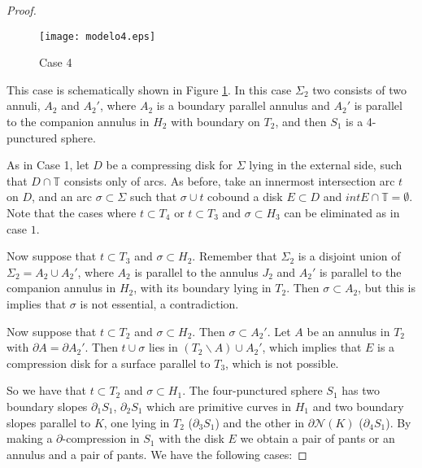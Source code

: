 \documentclass[12pt]{amsart}
\begin{document}
\begin{proof}
\begin{figure}
\begin{center}
\texttt{[image: modelo4.eps]}
\end{center}
\caption{Case 4}
\label{case4}
\end{figure}



This case is schematically shown in Figure \ref{case4}. In this case $\Sigma_2$ two consists of two annuli, $A_2$ and $A_2'$, where $A_2$ is a boundary parallel annulus and $A_2'$ is parallel to the companion annulus in $H_2$ with boundary on $T_2$, and then $S_1$ is a 4-punctured sphere.

As in Case 1, let $D$ be a compressing disk for $\Sigma$ lying in the external side, such that $D\cap\mathbb{T}$ consists only of arcs. As before, take an innermost intersection arc $t$ on $D$, and an arc $\sigma\subset\Sigma$ such that $\sigma\cup t$ cobound a disk $E\subset D$ and ${int}E\cap \mathbb{T}=\emptyset$. 
Note that the cases where $t\subset T_4$ or $t\subset T_3$ and $\sigma\subset H_3$ can be eliminated as in case $1$. 

Now suppose that $t\subset T_3$ and $\sigma\subset H_2$. Remember that  $\Sigma_2$ is a disjoint union of $\Sigma_2=A_2\cup A_2'$, where $A_2$ is parallel to the annulus $J_2$ and $A_2'$ is parallel to the companion annulus in $H_2$, with its boundary lying in $T_2$. Then $\sigma\subset A_2$, but this is implies that $\sigma$ is not essential, a contradiction. 

Now suppose that $t\subset T_2$ and $\sigma \subset H_2$. Then $\sigma \subset A_2'$. Let $A$ be an annulus in $T_2$ with $\partial A=\partial A_2'$. Then $t\cup \sigma$ lies in $(T_2\backslash A)\cup A_2'$, which implies that $E$ is a compression disk for a surface parallel to $T_3$, which is not possible.

So we have that $t\subset T_2$ and $\sigma\subset H_1$. The four-punctured sphere $S_1$ has two boundary slopes $\partial_1 S_1$, $\partial_2 S_1$ which are primitive curves in $H_1$ and two boundary slopes parallel to $K$, one lying in $T_2$ ($\partial_3 S_1$) and the other in $\partial\mathcal{N}(K)$ ($\partial_4 S_1$). By making a $\partial$-compression in $S_1$ with the disk $E$ we obtain a pair of pants or an annulus and a pair of pants. We have the following cases:


\end{proof}
\end{document}
